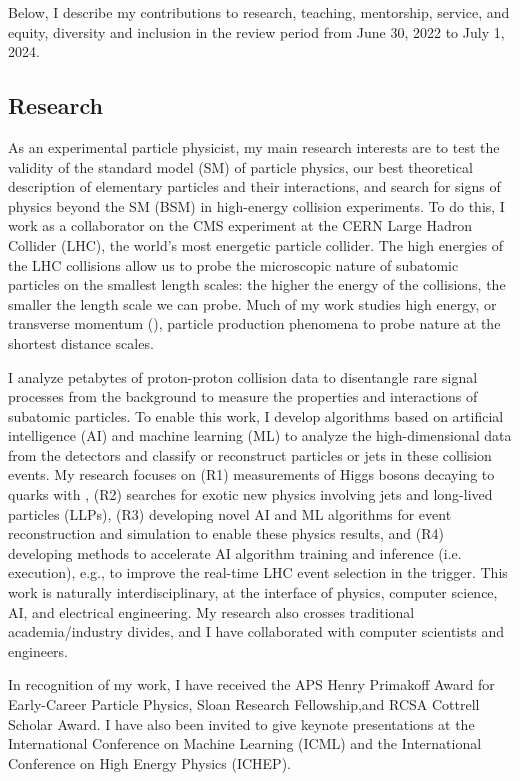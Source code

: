 \documentclass[11pt,letterpaper,notitlepage]{article}
\begin{document}
\pagestyle{fancyplain}

Below, I describe my contributions to research, teaching, mentorship, service, and equity, diversity and inclusion in the review period from June 30, 2022 to July 1, 2024.
\vspace{-1ex}
\subsection*{Research}

As an experimental particle physicist, my main research interests are to test the validity of the standard model (SM) of particle physics, our best theoretical description of elementary particles and their interactions, and search for signs of physics beyond the SM (BSM) in high-energy collision experiments.
To do this, I work as a collaborator on the CMS experiment at the CERN Large Hadron Collider (LHC), the world's most energetic particle collider.
The high energies of the LHC collisions allow us to probe the microscopic nature of subatomic particles on the smallest length scales: the higher the energy of the collisions, the smaller the length scale we can probe.
Much of my work studies high energy, or transverse momentum (\pt), particle production phenomena to probe nature at the shortest distance scales.

I analyze petabytes of proton-proton collision data to disentangle rare signal processes from the background to measure the properties and interactions of subatomic particles.
To enable this work, I develop algorithms based on artificial intelligence (AI) and machine learning (ML) to analyze the high-dimensional data from the detectors and classify or reconstruct particles or jets in these collision events.
My research focuses on
(R1) measurements of Higgs bosons decaying to quarks with \pt,
(R2) searches for exotic new physics involving jets and long-lived particles (LLPs),
(R3) developing novel AI and ML algorithms for event reconstruction and simulation to enable these physics results, and
(R4) developing methods to accelerate AI algorithm training and inference (i.e. execution), e.g., to improve the real-time LHC event selection in the trigger.
This work is naturally interdisciplinary, at the interface of physics, computer science, AI, and electrical engineering.
My research also crosses traditional academia/industry divides, and I have collaborated with computer scientists and engineers.

In recognition of my work, I have received the APS Henry Primakoff Award for Early-Career Particle Physics, Sloan Research Fellowship,and RCSA Cottrell Scholar Award.
I have also been invited to give keynote presentations at the International Conference on Machine Learning (ICML) and the International Conference on High Energy Physics (ICHEP).
\end{document}
